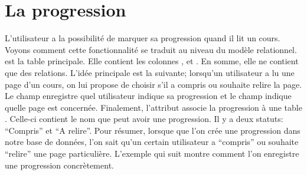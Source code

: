 \documentclass[a4paper,10pt,twoside]{sphinxmanual}
\begin{document}
\section{La progression}
\label{models:la-progression}
L'utilisateur a la possibilité de marquer sa progression quand il lit un cours. Voyons comment cette fonctionnalité se traduit au niveau du modèle relationnel.  est la table principale. Elle contient les colonnes ,  et . En somme, elle ne contient que des relations. L'idée principale est la suivante; lorsqu'un utilisateur a lu une page d'un cours, on lui propose de choisir s'il a compris ou souhaite relire la page. Le champ  enregistre quel utilisateur indique sa progression et le champ  indique quelle page est concernée. Finalement, l'attribut  associe la progression à une table . Celle-ci contient le nom que peut avoir une progression. Il y a deux statuts: ``Compris'' et ``A relire''. Pour résumer, lorsque que l'on crée une progression dans notre base de données, l'on sait qu'un certain utilisateur a ``compris'' ou souhaite ``relire'' une page particulière. L'exemple qui suit montre comment l'on enregistre une progression concrètement.
\end{document}
